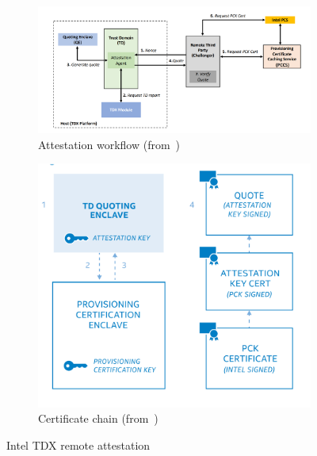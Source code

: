 \begin{figure}[htp]
  \centering
  \begin{subfigure}[b]{0.65\textwidth}
      \centering
      \includegraphics[width=\textwidth]{images/tdx_attestation_flow.png}
      \caption{Attestation workflow (from~\cite*{DBLP:journals/corr/abs-2303-15540})}
      \label{fig:tdx_attestation_flow}
  \end{subfigure}
  \hfill
  \begin{subfigure}[b]{0.3\textwidth}
      \centering
      \includegraphics[width=\textwidth]{images/tdx_certi_chain.png}
      \caption{Certificate chain (from~\cite*{Intel_tdx_whitepaper})}
      \label{fig:tdx_certi_chain}
  \end{subfigure}
  \hfill
     \caption[Intel TDX remote attestation]{Intel TDX remote attestation}
     \label{fig:tdx_attestation}
\end{figure}
